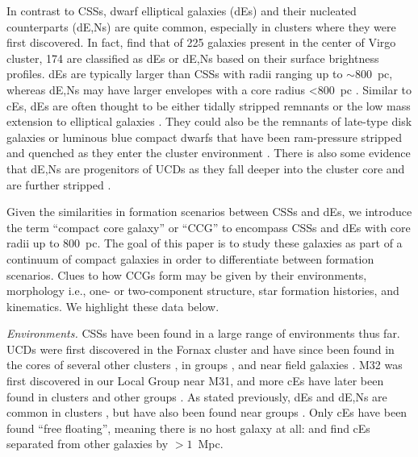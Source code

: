\documentclass[iop,apj]{emulateapj}
\begin{document}
In contrast to CSSs, dwarf elliptical galaxies (dEs) and their nucleated counterparts (dE,Ns) are quite common, especially in clusters where they were first discovered. In fact, \citet{Binggeli1991} find that of 225 galaxies present in the center of Virgo cluster, 174 are classified as dEs or dE,Ns based on their surface brightness profiles. dEs are typically larger than CSSs with radii ranging up to $\sim800$~pc, whereas dE,Ns may have larger envelopes with a core radius <$800$~pc \citep[e.g.,][]{Norris2014}. Similar to cEs, dEs are often thought to be either tidally stripped remnants \citep{Crnojevi2014} or the low mass extension to elliptical galaxies \citep{Kormendy2012a}. They could also be the remnants of late-type disk galaxies or luminous blue compact dwarfs that have been ram-pressure stripped and quenched as they enter the cluster environment \citep{Lisker2013, Crawford2016a}. There is also some evidence that dE,Ns are progenitors of UCDs as they fall deeper into the cluster core and are further stripped \citep{Pfeffer2013,Zhang2015,Liu2015}.

Given the similarities in formation scenarios between CSSs and dEs, we introduce the term ``compact core galaxy'' or ``CCG'' to encompass CSSs and dEs with core radii up to 800~pc. The goal of this paper is to study these galaxies as part of a continuum of compact galaxies in order to differentiate between formation scenarios. Clues to how CCGs form may be given by their environments,  morphology i.e., one- or two-component structure, star formation histories, and kinematics. We highlight these data below.

\textit{Environments.} CSSs have been found in a large range of environments thus far. UCDs were first discovered in the Fornax cluster \citep{Hilker1999, Drinkwater2000} and have since been found in the cores of several other clusters \citep{Price2009,Madrid2010,Jones2006,Mieske2009,Misgeld2008}, in groups \citep{Evstigneeva2007}, and near field galaxies \citep{Hau2009,Norris2011}. M32 was first discovered in our Local Group \citep{Faber1973} near M31, and more cEs have later been found in clusters \citep{Chilingarian2007,SmithCastelli2012,Price2009} and other groups \citep{Huxor2011,Chilingarian2010}. As stated previously, dEs and dE,Ns are common in clusters \citep{SmithCastelli2012,Koo1994,Guzman1996,Crawford2016a}, but have also been found near groups \citep{Crnojevi2014,Penny2014}. Only cEs have been found ``free floating'', meaning there is no host galaxy at all: \citet{Huxor2013} and \citet{Paudel2014} find cEs separated from other galaxies by $>1$~Mpc. 
\end{document}
